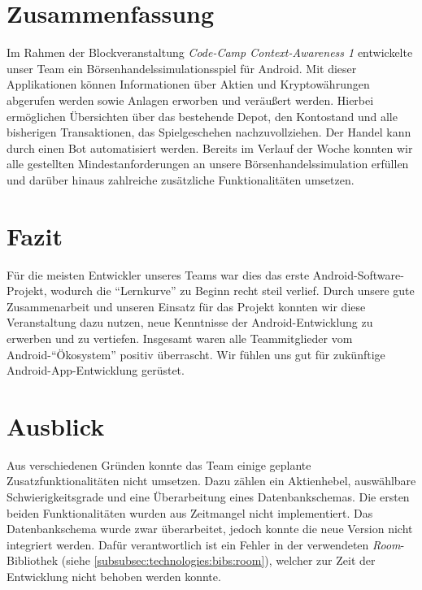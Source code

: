 \documentclass[a4paper]{article}
\begin{document}
\section{Zusammenfassung}
\label{sec:summary}
Im Rahmen der Blockveranstaltung \textit{Code-Camp Context-Awareness 1} entwickelte unser Team ein Börsenhandelssimulationsspiel für Android. Mit dieser Applikationen können Informationen über Aktien und Kryptowährungen abgerufen werden sowie Anlagen erworben und veräußert werden. Hierbei ermöglichen Übersichten über das bestehende Depot, den Kontostand und alle bisherigen Transaktionen, das Spielgeschehen nachzuvollziehen. Der Handel kann durch einen Bot automatisiert werden. \newline
Bereits im Verlauf der Woche konnten wir alle gestellten Mindestanforderungen an unsere Börsenhandelssimulation erfüllen und darüber hinaus zahlreiche zusätzliche Funktionalitäten umsetzen.


\section{Fazit}
\label{sec:conclusion}
Für die meisten Entwickler unseres Teams war dies das erste Android-Software-Projekt, wodurch die "`Lernkurve"' zu Beginn recht steil verlief. Durch unsere gute Zusammenarbeit und unseren Einsatz für das Projekt konnten wir diese Veranstaltung dazu nutzen, neue Kenntnisse der Android-Entwicklung zu erwerben und zu vertiefen. Insgesamt waren alle Teammitglieder vom Android-"`Ökosystem"' positiv überrascht. Wir fühlen uns gut für zukünftige Android-App-Entwicklung gerüstet.


\section{Ausblick}
\label{sec:outlook}
Aus verschiedenen Gründen konnte das Team einige geplante Zusatzfunktionalitäten nicht umsetzen.
Dazu zählen ein Aktienhebel, auswählbare Schwierigkeitsgrade und eine Überarbeitung eines Datenbankschemas.
Die ersten beiden Funktionalitäten wurden aus Zeitmangel nicht implementiert.
Das Datenbankschema wurde zwar überarbeitet, jedoch konnte die neue Version nicht integriert werden.
Dafür verantwortlich ist ein Fehler in der verwendeten \textit{Room}-Bibliothek (siehe \autoref{subsubsec:technologies:bibs:room}), welcher zur Zeit der Entwicklung nicht behoben werden konnte.

\begingroup
\raggedright
\printbibliography[title={Referenzen}]
\endgroup
\end{document}
